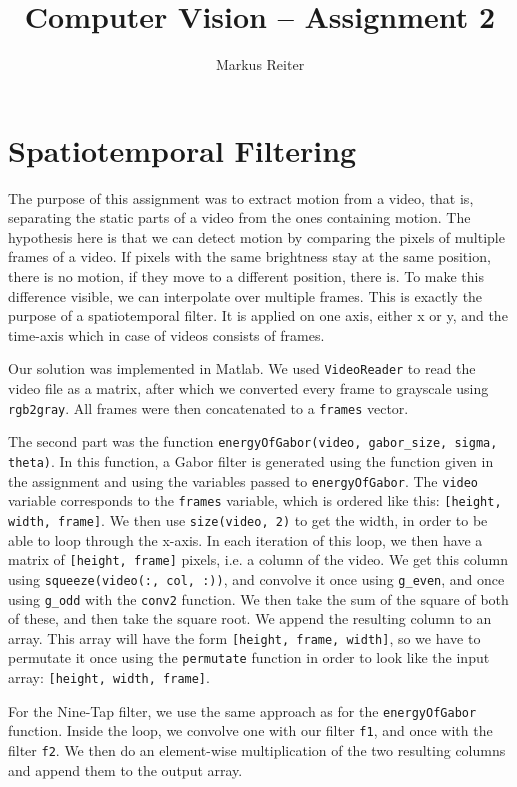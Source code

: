 \documentclass{article}
\title{Computer Vision – Assignment 2}
\author{Markus Reiter}
\begin{document}
\maketitle

  \section{Spatiotemporal Filtering}

  The purpose of this assignment was to extract motion from a video, that is, separating the static parts of a video from the ones containing motion. The hypothesis here is that we can detect motion by comparing the pixels of multiple frames of a video. If pixels with the same brightness stay at the same position, there is no motion, if they move to a different position, there is. To make this difference visible, we can interpolate over multiple frames. This is exactly the purpose of a spatiotemporal filter. It is applied on one axis, either x or y, and the time-axis which in case of videos consists of frames.

  Our solution was implemented in Matlab. We used \texttt{VideoReader} to read the video file as a matrix, after which we converted every frame to grayscale using \texttt{rgb2gray}. All frames were then concatenated to a \texttt{frames} vector.

  The second part was the function \texttt{energyOfGabor(video, gabor\_size, sigma, theta)}. In this function, a Gabor filter is generated using the function given in the assignment and using the variables passed to \texttt{energyOfGabor}. The \texttt{video} variable corresponds to the \texttt{frames} variable, which is ordered like this: \texttt{[height, width, frame]}. We then use \texttt{size(video, 2)} to get the width, in order to be able to loop through the x-axis. In each iteration of this loop, we then have a matrix of \texttt{[height, frame]} pixels, i.e. a column of the video. We get this column using \texttt{squeeze(video(:, col, :))}, and convolve it once using \texttt{g\_even}, and once using \texttt{g\_odd} with the \texttt{conv2} function. We then take the sum of the square of both of these, and then take the square root. We append the resulting column to an array. This array will have the form \texttt{[height, frame, width]}, so we have to permutate it once using the \texttt{permutate} function in order to look like the input array: \texttt{[height, width, frame]}.

  For the Nine-Tap filter, we use the same approach as for the \texttt{energyOfGabor} function. Inside the loop, we convolve one with our filter \texttt{f1}, and once with the filter \texttt{f2}. We then do an element-wise multiplication of the two resulting columns and append them to the output array.
\end{document}
